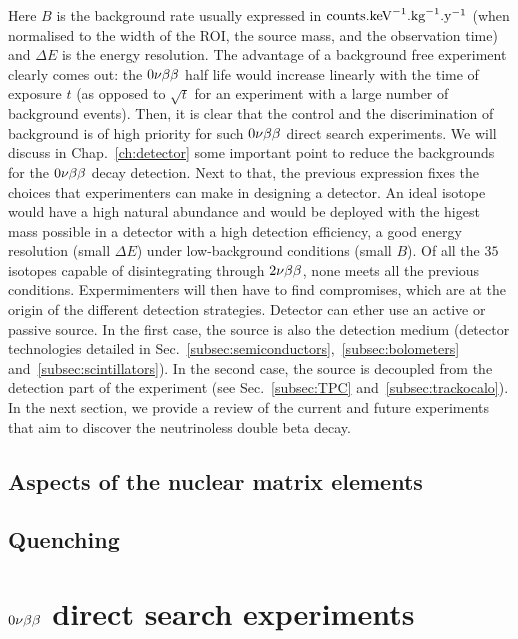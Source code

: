 Here $B$ is the background rate usually expressed in $\text{counts.keV}^{-1}\text{.kg}^{-1}\text{.y}^{-1}$ (when normalised to the width of the ROI, the source mass, and the observation time) and $\Delta E$ is the energy resolution.
The advantage of a background free experiment clearly comes out: the $0\nu\beta\beta$ half life would increase linearly with the time of exposure $t$ (as opposed to $\sqrt t$ for an experiment with a large number of background events).
Then, it is clear that the control and the discrimination of background is of high priority for such $0\nu\beta\beta$ direct search experiments.
We will discuss in Chap.~\ref{ch:detector} some important point to reduce the backgrounds for the $0\nu\beta\beta$ decay detection.
Next to that, the previous expression fixes the choices that experimenters can make in designing a detector.
An ideal isotope would have a high natural abundance and would be deployed with the higest mass possible in a detector with a high detection efficiency, a good energy resolution (small $\Delta E$) under low-background conditions (small $B$).
Of all the $35$ isotopes capable of disintegrating through $2\nu\beta\beta$, none meets all the previous conditions.
Expermimenters will then have to find compromises, which are at the origin of the different detection strategies.
Detector can ether use an active or passive source.
In the first case, the source is also the detection medium (detector technologies detailed in Sec.~\ref{subsec:semiconductors},~\ref{subsec:bolometers} and~\ref{subsec:scintillators}).
In the second case, the source is decoupled from the detection part of the experiment (see Sec.~\ref{subsec:TPC} and~\ref{subsec:trackocalo}).
In the next section, we provide a review of the current and future experiments that aim to discover the neutrinoless double beta decay.

\subsection{Aspects of the nuclear matrix elements}
\label{subsec:matrix_element}
\subsection{Quenching}
\label{subsec:quenching}

\section{$0\nu\beta\beta$ direct search experiments}
\label{sec:zeronuexp}
